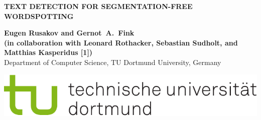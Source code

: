 \documentclass[a0,portrait]{a0poster}
\begin{document}
\sf\Huge\noindent\color{tucol2}\hspace*{-6.5mm}
\textbf{\MakeUppercase{Text Detection for Segmentation-free Wordspotting}}\color{Black}
\vspace*{15mm}


\noindent \begin{minipage}[b]{0.7\linewidth}
\huge\textbf{Eugen Rusakov and Gernot~A.~Fink\\
\large
(in collaboration with Leonard Rothacker, Sebastian Sudholt, and Matthias Kasperidus [1])
}\\[0.5cm] 
\Large
Department of Computer Science, TU Dortmund University, Germany
\end{minipage}
\begin{minipage}[t]{0.3\linewidth}
\hspace*{-2.9cm}
\includegraphics[width=20cm]{tud_logo_rgb.pdf}
\end{minipage}
\vspace*{-10mm}
\end{document}

